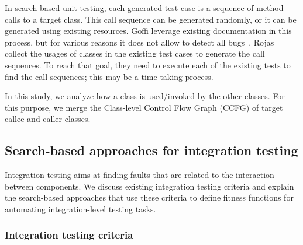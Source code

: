 In search-based unit testing, each generated test case is a sequence of method calls to a target class. This call sequence can be generated randomly, or it can be generated using existing resources. Goffi \etal \cite{Goffi2016} leverage existing documentation in this process, but for various reasons it does not allow to detect all bugs~\cite{robillard2011,blasi2018,zhou2017}.
Rojas \etal~\cite{Rojas2016} collect the usages of classes in the existing test cases to generate the call sequences. To reach that goal, they need to execute each of the existing tests to find the call sequences; this may be a time taking process.

In this study, we analyze how a class is used/invoked by the other classes. For this purpose, we merge the Class-level Control Flow Graph (CCFG) of target callee and caller classes. 




\subsection{Search-based approaches for integration testing}

Integration testing aims at finding faults that are related to the interaction between components.
We discuss existing integration testing criteria and explain the search-based approaches that use these criteria to define fitness functions for automating integration-level testing tasks.

\subsubsection{Integration testing criteria}
\label{sec:background-integ-testing-criteria}

